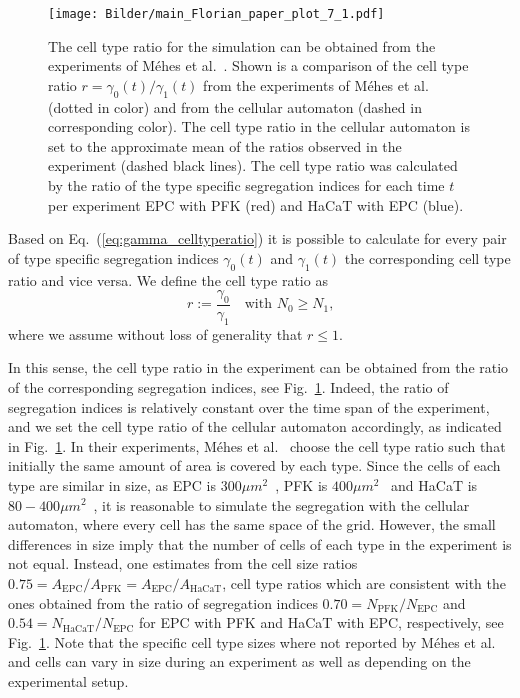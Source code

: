 \documentclass[10pt,letterpaper]{article}
\renewcommand{\eqref}[1]{Eq.~(\ref{eq:#1})}
\newcommand{\figref}[1]{Fig.~\ref{fig:#1}}
\begin{document}
\begin{figure}[ht!]
 \centering
 \texttt{[image: Bilder/main\_Florian\_paper\_plot\_7\_1.pdf]}
 \caption{The cell type ratio for the simulation can be obtained from
   the experiments of Méhes et al.~\cite{MehMonNemVic2012}. Shown is a
   comparison of the cell type ratio $r=\gamma_0(t)/\gamma_1(t)$ from
   the experiments of Méhes et al.~\cite{MehMonNemVic2012} (dotted in
   color) and from the cellular automaton (dashed in corresponding
   color). The cell type ratio in the cellular automaton is set to the
   approximate mean of the ratios observed in the experiment (dashed
   black lines). The cell type ratio was calculated by the ratio of
   the type specific segregation indices for each time $t$ per
   experiment EPC with PFK (red) and HaCaT with EPC (blue).}
 \label{fig:main_Florian_paper_plot_7_1}
\end{figure}

Based on \eqref{gamma_celltyperatio} it is possible to calculate for
every pair of type specific segregation indices $\gamma_0(t)$ and
$\gamma_1(t)$ the corresponding cell type ratio and vice versa. We
define the cell type ratio as
%
\begin{equation}
  \label{eq:celltyperatio}
  r:=\frac{\gamma_0}{\gamma_1} \quad \text{with } N_0 \geq N_1 \text{,}
\end{equation}
%
where we assume without loss of generality that $r\leq1$.

In this sense, the cell type ratio in the experiment can be obtained
from the ratio of the corresponding segregation indices, see
\figref{main_Florian_paper_plot_7_1}. Indeed, the ratio of segregation
indices is relatively constant over the time span of the experiment,
and we set the cell type ratio of the cellular automaton accordingly,
as indicated in \figref{main_Florian_paper_plot_7_1}. In their
experiments, Méhes et al.~\cite{MehMonNemVic2012} choose the
cell type ratio such that initially the same amount of area is covered by
each type. Since the cells of each type are similar in size, as EPC is
$300\mu m^2$~\cite{FijEtal1983}, PFK is
$400 \mu m^2$~\cite{MehVic2013} and HaCaT is
$80-400\mu m^2$~\cite{BoeVePon1999}, it is reasonable to simulate the
segregation with the cellular automaton, where every cell has the same
space of the grid. However, the small differences in size imply that
the number of cells of each type in the experiment is not equal.
Instead, one estimates from the cell size ratios
$0.75=A_\text{EPC}/A_\text{PFK}=A_\text{EPC}/A_\text{HaCaT}$, cell
type ratios which are consistent with the ones obtained from the ratio
of segregation indices $0.70=N_\text{PFK}/N_\text{EPC}$ and
$0.54=N_\text{HaCaT}/N_\text{EPC}$ for EPC with PFK and HaCaT with
EPC, respectively, see \figref{main_Florian_paper_plot_7_1}. Note that
the specific cell type sizes where not reported by Méhes et
al.~\cite{MehMonNemVic2012} and cells can vary in size during an
experiment as well as depending on the experimental setup.
\end{document}
